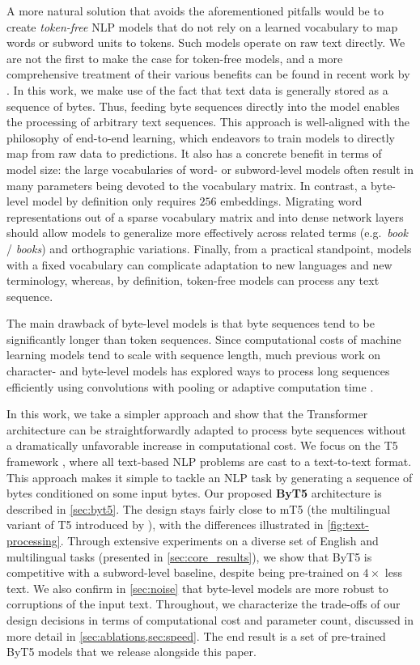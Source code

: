 \documentclass[11pt,a4paper]{article}
\begin{document}
A more natural solution that avoids the aforementioned pitfalls would be to create \textit{token-free} NLP models that do not rely on a learned vocabulary to map words or subword units to tokens.
Such models operate on raw text directly.
We are not the first to make the case for token-free models, and a more comprehensive treatment of their various benefits can be found in recent work by \citet{clark2021canine}.
In this work, we make use of the fact that text data is generally stored as a sequence of bytes.
Thus, feeding byte sequences directly into the model enables the processing of arbitrary text sequences.
This approach is well-aligned with the philosophy of end-to-end learning, which endeavors to train models to directly map from raw data to predictions.
It also has a concrete benefit in terms of model size: the large vocabularies of word- or subword-level models often result in many parameters being devoted to the vocabulary matrix.
In contrast, a byte-level model by definition only requires $256$ embeddings.
Migrating word representations out of a sparse vocabulary matrix and into dense network layers should allow models to generalize more effectively across related terms (e.g.~\textit{book} / \textit{books}) and orthographic variations.
Finally, from a practical standpoint, models with a fixed vocabulary can complicate adaptation to new languages and new terminology, whereas, by definition, token-free models can process any text sequence.

The main drawback of byte-level models is that byte sequences tend to be significantly longer than token sequences. Since computational costs of machine learning models tend to scale with sequence length, much previous work on character- and byte-level models has explored ways to process long sequences efficiently using convolutions with pooling \cite{xiang-2015-character, lee-etal-2017-fully} or adaptive computation time \cite{graves-2016-adaptive}.

In this work, we take a simpler approach and show that the Transformer architecture can be straightforwardly adapted to process byte sequences without a dramatically unfavorable increase in computational cost.
We focus on the T5 framework \cite{raffel-2020-t5}, where all text-based NLP problems are cast to a text-to-text format.
This approach makes it simple to tackle an NLP task by generating a sequence of bytes conditioned on some input bytes.
Our proposed \textbf{ByT5} architecture is described in \cref{sec:byt5}. The design stays fairly close to mT5 (the multilingual variant of T5 introduced by \citet{mt5}), with the differences illustrated in \cref{fig:text-processing}.
Through extensive experiments on a diverse set of English and multilingual tasks (presented in \cref{sec:core_results}), we show that ByT5 is competitive with a subword-level baseline, despite being pre-trained on $4\times$ less text.
We also confirm in \cref{sec:noise} that byte-level models are more robust to corruptions of the input text.
Throughout, we characterize the trade-offs of our design decisions in terms of computational cost and parameter count, discussed in more detail in \cref{sec:ablations,sec:speed}.
The end result is a set of pre-trained ByT5 models that we release alongside this paper.
\end{document}
